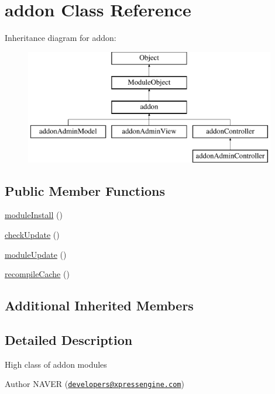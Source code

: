 \hypertarget{classaddon}{\section{addon Class Reference}
\label{classaddon}
}
Inheritance diagram for addon\-:\begin{figure}[H]
\begin{center}
\leavevmode
\includegraphics[height=5.000000cm]{classaddon}
\end{center}
\end{figure}
\subsection*{Public Member Functions}
\begin{DoxyCompactItemize}
\item 
\hyperlink{classaddon_a7ac2ab52a9e9cdc5c890b38a958b74ab}{module\-Install} ()
\item 
\hyperlink{classaddon_a88804ecbcb4993b0ad3fe2ac9763f17b}{check\-Update} ()
\item 
\hyperlink{classaddon_af26212943701043993c73a5e81e93ca1}{module\-Update} ()
\item 
\hyperlink{classaddon_ad2d70e001c5ec84c799e31c4fa761d9c}{recompile\-Cache} ()
\end{DoxyCompactItemize}
\subsection*{Additional Inherited Members}


\subsection{Detailed Description}
High class of addon modules \begin{DoxyAuthor}{Author}
N\-A\-V\-E\-R (\href{mailto:developers@xpressengine.com}{\tt developers@xpressengine.\-com}) 
\end{DoxyAuthor}


